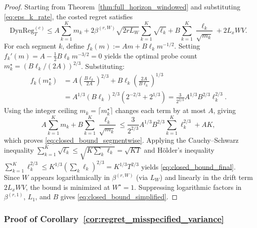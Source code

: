\documentclass{article}
\newcommand{\DynReg}{\mathrm{DynReg}}
\begin{document}
\begin{proof}
Starting from Theorem~\ref{thm:full_horizon_windowed} and substituting \eqref{eq:eps_k_rate}, the costed regret satisfies
\[
\DynReg_T^{(c)} \le A\sum_{k=1}^K m_k + 2\beta^{(r,W)}\sqrt{2rL_W}\sum_{k=1}^K \sqrt{\ell_k} + B\sum_{k=1}^K \frac{\ell_k}{\sqrt{m_k}} + 2L_xWV.
\]
For each segment $k$, define $f_k(m) := Am + B\ell_k m^{-1/2}$. Setting $f_k'(m) = A - \tfrac{1}{2}B\ell_k m^{-3/2} = 0$ yields the optimal probe count $m_k^\star = (B\ell_k/(2A))^{2/3}$. Substituting:
\begin{align*}
f_k(m_k^\star) &= A\!\left(\frac{B\ell_k}{2A}\right)^{\!2/3} + B\ell_k\!\left(\frac{2A}{B\ell_k}\right)^{\!1/3} \\
&= A^{1/3}(B\ell_k)^{2/3}\!\left(2^{-2/3}+2^{1/3}\right) = \frac{3}{2^{2/3}}A^{1/3}B^{2/3}\ell_k^{2/3}.
\end{align*}
Using the integer ceiling $m_k = \lceil m_k^\star \rceil$ changes each term by at most $A$, giving
\[
A\sum_{k=1}^K m_k + B\sum_{k=1}^K \frac{\ell_k}{\sqrt{m_k}} \le \frac{3}{2^{2/3}} A^{1/3} B^{2/3} \sum_{k=1}^K \ell_k^{2/3} + AK,
\]
which proves \eqref{eq:closed_bound_segmentwise}.
Applying the Cauchy--Schwarz inequality $\sum_{k=1}^K \sqrt{\ell_k} \le \sqrt{K \sum_k \ell_k} = \sqrt{KT}$ and H\"older's inequality $\sum_{k=1}^K \ell_k^{2/3} \le K^{1/3}\!\left(\sum_k \ell_k\right)^{2/3} = K^{1/3}T^{2/3}$ yields \eqref{eq:closed_bound_final}.
Since $W$ appears logarithmically in $\beta^{(r,W)}$ (via $L_W$) and linearly in the drift term $2L_xWV$, the bound is minimized at $W^\star = 1$.
Suppressing logarithmic factors in $\beta^{(r,1)}$, $L_1$, and $B$ gives \eqref{eq:closed_bound_simplified}.
\end{proof}

\subsubsection{Proof of Corollary~\ref{cor:regret_misspecified_variance}}
\label{proof:regret_misspecified_variance}
\end{document}
